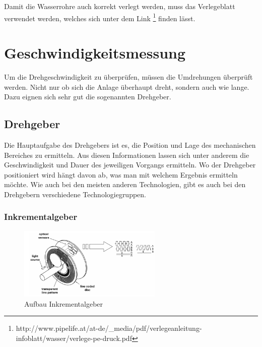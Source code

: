 Damit die Wasserrohre auch korrekt verlegt werden, muss das Verlegeblatt verwendet werden, welches sich unter dem Link \footnote{http://www.pipelife.at/at-de/_media/pdf/verlegeanleitung-infoblatt/wasser/verlege-pe-druck.pdf} finden lässt.

\newpage
\section{Geschwindigkeitsmessung}
\label{sec:geschwindigkeitsmessung}

Um die Drehgeschwindigkeit zu überprüfen, müssen die Umdrehungen überprüft werden. Nicht nur ob sich die Anlage überhaupt dreht, sondern auch wie lange. Dazu eignen sich sehr gut die sogenannten Drehgeber.

\subsection{Drehgeber}
\label{sec:drehgeber}

Die Hauptaufgabe des Drehgebers ist es, die Position und Lage des mechanischen Bereiches zu ermitteln. Aus diesen Informationen lassen sich unter anderem die Geschwindigkeit und Dauer des jeweiligen Vorgangs ermitteln. Wo der Drehgeber positioniert wird hängt davon ab, was man mit welchem Ergebnis ermitteln möchte. Wie auch bei den meisten anderen Technologien, gibt es auch bei den Drehgebern verschiedene Technologiegruppen.

\subsubsection{Inkrementalgeber}
\label{sec:inkrementalgeber}

\begin{figure}[H]
\begin{center}
	\includegraphics[width=0.61\textwidth]{fig/Inkrementalgeber}
	\caption{Aufbau Inkrementalgeber \label{fig:inkrementalgeber}}
\end{center}
\end{figure}

